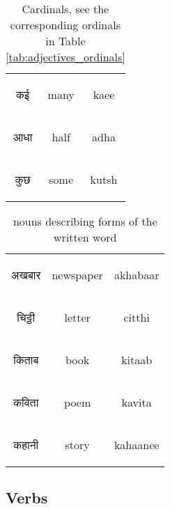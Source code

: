 \begin{table}[H]
\begin{tabular}{c|c|c}
    \begin{hindi} कई  \end{hindi} & many & kaee \\
    \begin{hindi} आधा  \end{hindi} & half & adha \\
    \begin{hindi} कुछ  \end{hindi} & some & kutsh \\
    \end{tabular}
    \caption{Cardinals, see the corresponding ordinals in Table \ref{tab:adjectives_ordinals}}
    \label{tab:nouns_cardinals}
\end{table}

\begin{table}[H]
    \centering
    \begin{tabular}{c|c|c}        
    \begin{hindi} अखबार\end{hindi} & newspaper 	& akhabaar \\
    \begin{hindi}चिट्ठी  \end{hindi} & letter 	&  citthi\\
    \begin{hindi}किताब   \end{hindi} & book 	&  kitaab\\
    \begin{hindi}कविता   \end{hindi} & poem 	&  kavita\\
    \begin{hindi}कहानी   \end{hindi} & story	&  kahaanee \\
    \end{tabular}
	\caption{nouns describing forms of the written word}
    \label{tab:nouns_literature}
\end{table}

\newpage 
\subsection{Verbs}


